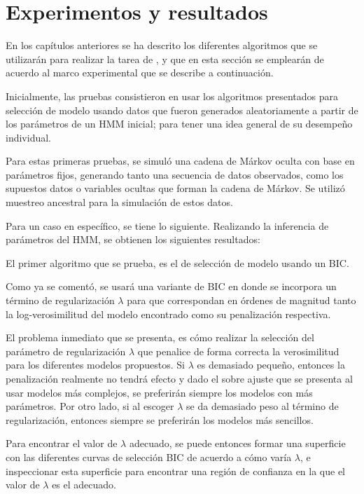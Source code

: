 
\chapter{Experimentos y resultados}\label{ch:chap5}

En los capítulos anteriores se ha descrito los diferentes algoritmos que se utilizarán para realizar la tarea de \sd, y que en esta sección se emplearán de acuerdo al marco experimental que se describe a continuación.

Inicialmente, las pruebas consistieron en usar los algoritmos presentados para selección de modelo usando datos que fueron generados aleatoriamente a partir de los parámetros de un \ac{HMM} inicial; para tener una idea general de su desempeño individual.

Para estas primeras pruebas, se simuló una cadena de Márkov oculta con base en parámetros fijos, generando tanto una secuencia de datos observados, como los supuestos datos o variables ocultas que forman la cadena de Márkov. Se utilizó muestreo ancestral para la simulación de estos datos.

Para un caso en específico, se tiene lo siguiente. Realizando la inferencia de parámetros del \ac{HMM}, se obtienen los siguientes resultados:

El primer algoritmo que se prueba, es el de selección de modelo usando un \ac{BIC}.

Como ya se comentó, se usará una variante de \ac{BIC} en donde se incorpora un término de regularización $\lambda$ para que correspondan en órdenes de magnitud tanto la log-verosimilitud del modelo encontrado como su penalización respectiva.

El problema inmediato que se presenta, es cómo realizar la selección del parámetro de regularización $\lambda$ que penalice de forma correcta la verosimilitud para los diferentes modelos propuestos. Si $\lambda$ es demasiado pequeño, entonces la penalización realmente no tendrá efecto y dado el sobre ajuste que se presenta al usar modelos más complejos, se preferirán siempre los modelos con más parámetros. Por otro lado, si al escoger $\lambda$ se da demasiado peso al término de regularización, entonces siempre se preferirán los modelos más sencillos.

Para encontrar el valor de $\lambda$ adecuado, se puede entonces formar una superficie con las diferentes curvas de selección \ac{BIC} de acuerdo a cómo varía $\lambda$, e inspeccionar esta superficie para encontrar una región de confianza en la que el valor de $\lambda$ es el adecuado.

